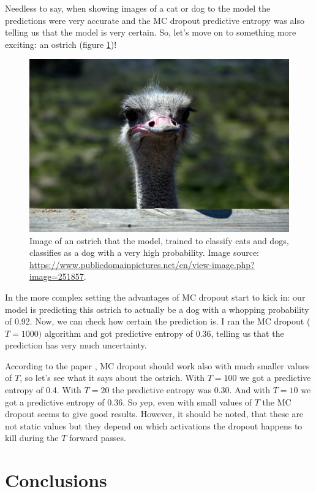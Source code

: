 \documentclass[11pt]{article}
\begin{document}
Needless to say, when showing images of a cat or dog to the model the predictions were very accurate and the MC dropout predictive entropy was also telling us that the model is very certain. So, let's move on to something more exciting: an ostrich (figure \ref{fig:ostrich})!

\begin{figure}
    \center
    \includegraphics[scale=0.15]{images/ostrich}
    \caption{Image of an ostrich that the model, trained to classify cats and dogs, classifies as a dog with a very high probability. Image source: \url{https://www.publicdomainpictures.net/en/view-image.php?image=251857}.}
    \label{fig:ostrich}
\end{figure}

In the more complex setting the advantages of MC dropout start to kick in: our model is predicting this ostrich to actually be a dog with a whopping probability of 0.92. Now, we can check how certain the prediction is. I ran the MC dropout ($T=1000)$ algorithm and got predictive entropy of 0.36, telling us that the prediction has very much uncertainty.

According to the paper \cite{gal2016dropout}, MC dropout should work also with much smaller values of $T$, so let's see what it says about the ostrich. With $T=100$ we got a predictive entropy of 0.4. With $T=20$ the predictive entropy was 0.30. And with $T=10$ we got a predictive entropy of 0.36. So yep, even with small values of $T$ the MC dropout seems to give good results. However, it should be noted, that these are not static values but they depend on which activations the dropout happens to kill during the $T$ forward passes.

\section{Conclusions}
\end{document}
